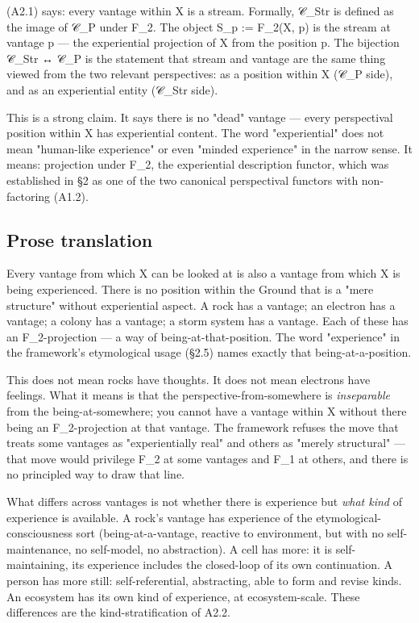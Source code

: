 \documentclass[11pt, openany]{book}
\begin{document}
(A2.1) says: every vantage within X is a stream. Formally, 𝒞\_\allowbreak{}Str is defined as the image of 𝒞\_\allowbreak{}P under F\_\allowbreak{}2. The object S\_\allowbreak{}p := F\_\allowbreak{}2(X, p) is the stream at vantage p --- the experiential projection of X from the position p. The bijection 𝒞\_\allowbreak{}Str ↔ 𝒞\_\allowbreak{}P is the statement that stream and vantage are the same thing viewed from the two relevant perspectives: as a position within X (𝒞\_\allowbreak{}P side), and as an experiential entity (𝒞\_\allowbreak{}Str side).

This is a strong claim. It says there is no "dead" vantage --- every perspectival position within X has experiential content. The word "experiential" does not mean "human-like experience" or even "minded experience" in the narrow sense. It means: projection under F\_\allowbreak{}2, the experiential description functor, which was established in §2 as one of the two canonical perspectival functors with non-factoring (A1.2).

\subsection{Prose translation}

Every vantage from which X can be looked at is also a vantage from which X is being experienced. There is no position within the Ground that is a "mere structure" without experiential aspect. A rock has a vantage; an electron has a vantage; a colony has a vantage; a storm system has a vantage. Each of these has an F\_\allowbreak{}2-projection --- a way of being-at-that-position. The word "experience" in the framework's etymological usage (§2.5) names exactly that being-at-a-position.

This does not mean rocks have thoughts. It does not mean electrons have feelings. What it means is that the perspective-from-somewhere is \textit{inseparable} from the being-at-somewhere; you cannot have a vantage within X without there being an F\_\allowbreak{}2-projection at that vantage. The framework refuses the move that treats some vantages as "experientially real" and others as "merely structural" --- that move would privilege F\_\allowbreak{}2 at some vantages and F\_\allowbreak{}1 at others, and there is no principled way to draw that line.

What differs across vantages is not whether there is experience but \textit{what kind} of experience is available. A rock's vantage has experience of the etymological-consciousness sort (being-at-a-vantage, reactive to environment, but with no self-maintenance, no self-model, no abstraction). A cell has more: it is self-maintaining, its experience includes the closed-loop of its own continuation. A person has more still: self-referential, abstracting, able to form and revise kinds. An ecosystem has its own kind of experience, at ecosystem-scale. These differences are the kind-stratification of A2.2.
\end{document}

